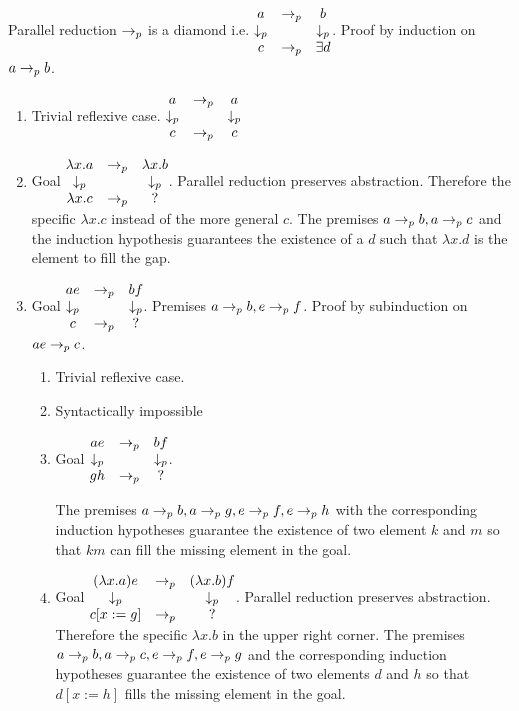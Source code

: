 \documentclass{article}
\begin{document}
\begin{theorem}
  Parallel reduction $\to_{p}$ is a diamond i.e.
  $\begin{matrix}
    a & \to_{p} & b \\
    \downarrow_p & & \downarrow_p \\
    c & \to_{p} & \exists d
  \end{matrix}
  $.
  Proof by induction on $a \to_{p} b$.
  \begin{enumerate}
  \item
    Trivial reflexive case.
    $\begin{matrix} a & \to_p & a \\ \downarrow_p & & \downarrow_p \\ c & \to_p & c \end{matrix}
    $

  \item Goal
    $\begin{matrix} \lambda x.a & \to_p & \lambda x.b \\ \downarrow_p & & \downarrow_p \\ \lambda x.c & \to_p & ? \end{matrix}$.
    Parallel reduction preserves abstraction. Therefore the specific
    $\lambda x.c$ instead of the more general $c$.
    The premises $a\to_{p} b, a \to_{p} c$ and the induction hypothesis
    guarantees the existence of a $d$ such that $\lambda x.d$ is the element
    to fill the gap.

  \item
    Goal $\begin{matrix} a e & \to_p & b f \\ \downarrow_p & & \downarrow_p \\ c & \to_p & ? \end{matrix}$. Premises $a \to_{p} b, e \to_{p} f$.
    Proof by subinduction on $a e \to_{p} c$.

    \begin{enumerate}
    \item Trivial reflexive case.
    \item Syntactically impossible
    \item
      Goal $\begin{matrix} a e & \to_p & b f \\ \downarrow_p & & \downarrow_p \\ g h & \to_p & ? \end{matrix}$.

      The premises $a \to_{p} b, a \to_{p} g, e \to_{p} f, e \to_{p} h$
      with the corresponding induction hypotheses guarantee the existence of
      two element $k$ and $m$ so that $ k m$ can fill the missing element in
      the goal.

    \item
      Goal $\begin{matrix} (\lambda x.a) e & \to_p & (\lambda x.b) f \\ \downarrow_p & & \downarrow_p \\ c[x:=g] & \to_p & ? \end{matrix}$.
      Parallel reduction preserves abstraction. Therefore the specific
      $\lambda x.b$ in the upper right corner.
      The premises $a \to_{p} b, a \to_{p} c, e \to_{p} f, e \to_{p} g$
      and the corresponding induction hypotheses guarantee the existence of
      two elements $d$ and $h$ so that $d[x:=h]$ fills the missing element
      in the goal.
    \end{enumerate}


\end{enumerate}
\end{theorem}
\end{document}
